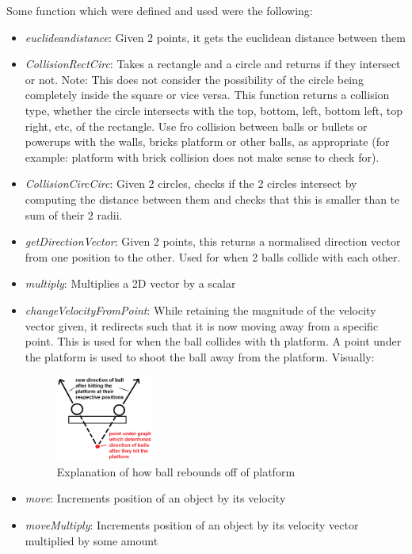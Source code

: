 Some function which were defined and used were the following:
\begin{itemize}
	\item \textit{euclidean\un distance}: Given 2 points, it gets the euclidean distance between them
	\item \textit{CollisionRectCirc}: Takes a rectangle and a circle and returns if they intersect or not. Note: This does not consider the possibility of the circle being completely inside the square or vice versa. This function returns a collision type, whether the circle intersects with the top, bottom, left, bottom left, top right, etc, of the rectangle. Use fro collision between balls or bullets or powerups with the walls, bricks platform or other balls, as appropriate (for example: platform with brick collision does not make sense to check for).
	\item \textit{CollisionCircCirc}: Given 2 circles, checks if the 2 circles intersect by computing the distance between them and checks that this is smaller than te sum of their 2 radii.
	\item \textit{getDirectionVector}: Given 2 points, this returns a normalised direction vector from one position to the other. Used for when 2 balls collide with each other.
	\item \textit{multiply}: Multiplies a 2D vector by a scalar
	\item \textit{changeVelocityFromPoint}: While retaining the magnitude of the velocity vector given, it redirects such that it is now moving away from a specific point. This is used for when the ball collides with th platform. A point under the platform is used to shoot the ball away from the platform. Visually:
	\begin{figure}[H]
		\centering
		\includegraphics[width=0.3\textwidth]{Images/BallPlatform.png}
		\caption{Explanation of how ball rebounds off of platform}
	\end{figure}
	\item \textit{move}: Increments position of an object by its velocity
	\item \textit{moveMultiply}: Increments position of an object by its velocity vector multiplied by some amount
\end{itemize}

